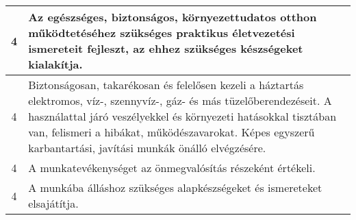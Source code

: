 \begin{longtable}{c | p{} }
                                
                                          4 &  Az egészséges, biztonságos, környezettudatos otthon működtetéséhez szükséges praktikus életvezetési ismereteit fejleszt, az ehhez szükséges készségeket kialakítja. \\ \hline
                                          4 &  Biztonságosan, takarékosan és felelősen kezeli a háztartás elektromos, víz-, szennyvíz-, gáz- és más tüzelőberendezéseit. A használattal járó veszélyekkel és környezeti hatásokkal tisztában van, felismeri a hibákat, működészavarokat. Képes egyszerű karbantartási, javítási munkák önálló elvégzésére. \\ \hline
                                          4 &  A munkatevékenységet az önmegvalósítás részeként értékeli. \\ \hline
                                          4 &  A munkába álláshoz szükséges alapkészségeket és ismereteket elsajátítja. \\ \hline
                                      
                        \end{longtable}
            \clearpage

